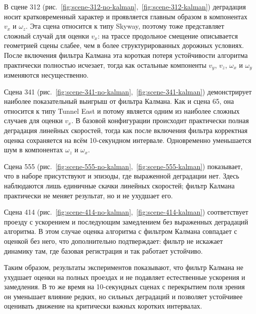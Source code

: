 В сцене 312 (рис.~\ref{fig:scene-312-no-kalman},~\ref{fig:scene-312-kalman}) деградация носит кратковременный характер и проявляется главным образом в компонентах \(v_x\) и \(\omega_z\). Эта сцена относится к типу Skyway, поэтому тоже представляет сложный случай для оценки \(v_x\): на трассе продольное смещение описывается геометрией сцены слабее, чем в более структурированных дорожных условиях. После включения фильтра Калмана эта короткая потеря устойчивости алгоритма практически полностью исчезает, тогда как остальные компоненты \(v_y\), \(v_z\), \(\omega_x\) и \(\omega_y\) изменяются несущественно.

Сцена 341 (рис.~\ref{fig:scene-341-no-kalman},~\ref{fig:scene-341-kalman}) демонстрирует наиболее показательный выигрыш от фильтра Калмана. Как и сцена 65, она относится к типу Tunnel East и потому является одним из наиболее сложных случаев для оценки \(v_x\). В базовой конфигурации происходит практически полная деградация линейных скоростей, тогда как после включения фильтра корректная оценка сохраняется на всём 10-секундном интервале. Одновременно уменьшается шум в компонентах \(\omega_z\) и \(\omega_x\).

Сцена 555 (рис.~\ref{fig:scene-555-no-kalman},~\ref{fig:scene-555-kalman}) показывает, что в наборе присутствуют и эпизоды, где выраженной деградации нет. Здесь наблюдаются лишь единичные скачки линейных скоростей; фильтр Калмана практически не меняет результат, но и не ухудшает его.

Сцена 414 (рис.~\ref{fig:scene-414-no-kalman},~\ref{fig:scene-414-kalman}) соответствует проезду с ускорением и последующим замедлением без выраженных деградаций алгоритма. В этом случае оценка алгоритма с фильтром Калмана совпадает с оценкой без него, что дополнительно подтверждает: фильтр не искажает динамику там, где базовая регистрация и так работает устойчиво.

Таким образом, результаты экспериментов показывают, что фильтр Калмана не ухудшает оценки на полных проездах и не подавляет естественные ускорения и замедления. В то же время на 10-секундных сценах с перекрытием поля зрения он уменьшает влияние редких, но сильных деградаций и позволяет устойчивее оценивать движение на критически важных коротких интервалах.
